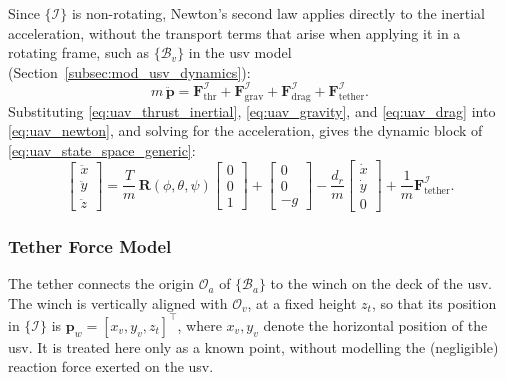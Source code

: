 Since $\{\mathcal{I}\}$ is non-rotating, Newton's second law applies directly to the inertial acceleration, without the transport terms that arise when applying it in a rotating frame, such as $\{\mathcal{B}_v\}$ in the \gls{usv} model (Section~\ref{subsec:mod_usv_dynamics}):
\begin{equation}
    m\,\ddot{\mathbf{p}} = \mathbf{F}_{\mathrm{thr}}^{\mathcal{I}} + \mathbf{F}_{\mathrm{grav}}^{\mathcal{I}} + \mathbf{F}_{\mathrm{drag}}^{\mathcal{I}} + \mathbf{F}_{\mathrm{tether}}^{\mathcal{I}}.
    \label{eq:uav_newton}
\end{equation}
Substituting \eqref{eq:uav_thrust_inertial}, \eqref{eq:uav_gravity}, and \eqref{eq:uav_drag} into \eqref{eq:uav_newton}, and solving for the acceleration, gives the dynamic block of \eqref{eq:uav_state_space_generic}:
\begin{equation}
    \begin{bmatrix} \ddot{x} \\ \ddot{y} \\ \ddot{z} \end{bmatrix} = \frac{T}{m}\,\mathbf{R}(\phi,\theta,\psi)\begin{bmatrix} 0 \\ 0 \\ 1 \end{bmatrix} + \begin{bmatrix} 0 \\ 0 \\ -g \end{bmatrix} - \frac{d_r}{m}\begin{bmatrix} \dot{x} \\ \dot{y} \\ 0 \end{bmatrix} + \frac{1}{m}\mathbf{F}_{\mathrm{tether}}^{\mathcal{I}}.
    \label{eq:uav_dynamics}
\end{equation}

\subsubsection{Tether Force Model}
\label{subsec:mod_uav_tether}
\label{subsec:mod_tether_force_model}

The tether connects the origin $\mathcal{O}_a$ of $\{\mathcal{B}_a\}$ to the winch on the deck of the \gls{usv}. The winch is vertically aligned with $\mathcal{O}_v$, at a fixed height $z_t$, so that its position in $\{\mathcal{I}\}$ is $\mathbf{p}_w = [x_v, y_v, z_t]^\top$, where $x_v, y_v$ denote the horizontal position of the \gls{usv}. It is treated here only as a known point, without modelling the (negligible) reaction force exerted on the \gls{usv}.

